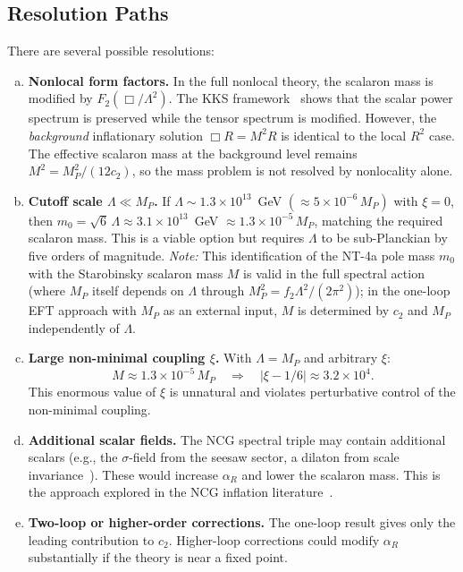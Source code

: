 \documentclass[11pt,a4paper]{article}
\theoremstyle{plain}
\theoremstyle{definition}
\begin{document}
\subsection{Resolution Paths}

There are several possible resolutions:

\begin{enumerate}[(a)]
  \item \textbf{Nonlocal form factors.}
    In the full nonlocal theory, the scalaron mass is modified by
    $F_2(\Box/\Lambda^2)$. The KKS framework~\cite{KKS17,KKS20,KKS22}
    shows that the scalar power spectrum is preserved while the tensor
    spectrum is modified. However, the \emph{background} inflationary
    solution $\Box R = M^2 R$ is identical to the local $R^2$ case.
    The effective scalaron mass at the background level remains
    $M^2 = M_P^2/(12c_2)$, so the mass problem is not resolved by
    nonlocality alone.

  \item \textbf{Cutoff scale $\Lambda \ll M_P$.}
    If $\Lambda \sim 1.3 \times 10^{13}$~GeV $(\approx 5 \times 10^{-6}\,M_P)$
    with $\xi = 0$, then
    $m_0 = \sqrt{6}\,\Lambda \approx 3.1 \times 10^{13}$~GeV
    $\approx 1.3 \times 10^{-5}\,M_P$, matching the required scalaron
    mass. This is a viable option but requires $\Lambda$ to be
    sub-Planckian by five orders of magnitude.
    \emph{Note:} This identification of the NT-4a pole mass $m_0$ with
    the Starobinsky scalaron mass $M$ is valid in the full spectral
    action (where $M_P$ itself depends on $\Lambda$ through
    $M_P^2 = f_2 \Lambda^2/(2\pi^2)$); in the one-loop EFT approach
    with $M_P$ as an external input, $M$ is determined by $c_2$ and
    $M_P$ independently of $\Lambda$.

  \item \textbf{Large non-minimal coupling $\xi$.}
    With $\Lambda = M_P$ and arbitrary $\xi$:
    \[
      M \approx 1.3 \times 10^{-5}\,M_P
      \quad\Longrightarrow\quad
      |\xi - 1/6| \approx 3.2 \times 10^{4}.
    \]
    This enormous value of $\xi$ is unnatural and violates perturbative
    control of the non-minimal coupling.

  \item \textbf{Additional scalar fields.}
    The NCG spectral triple may contain additional scalars (e.g., the
    $\sigma$-field from the seesaw sector, a dilaton from scale
    invariance~\cite{CC05}). These would increase $\alpha_R$ and lower
    the scalaron mass. This is the approach explored in the NCG
    inflation literature~\cite{NS09,BFS10}.

  \item \textbf{Two-loop or higher-order corrections.}
    The one-loop result gives only the leading contribution to $c_2$.
    Higher-loop corrections could modify $\alpha_R$ substantially if
    the theory is near a fixed point.
\end{enumerate}
\end{document}
